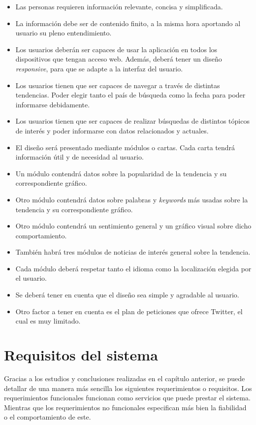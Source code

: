 \begin{itemize}
    \item
    Las personas requieren información relevante, concisa y simplificada.
    \item
    La información debe ser de contenido finito, a la misma hora aportando al usuario su pleno entendimiento.
    \item
    Los usuarios deberán ser capaces de usar la aplicación en todos los dispositivos que tengan acceso web. Además, deberá tener un diseño \textit{responsive}, para que se adapte a la interfaz del usuario.
    \item
    Los usuarios tienen que ser capaces de navegar a través de distintas tendencias. Poder elegir tanto el país de búsqueda como la fecha para poder informarse debidamente.
    \item
    Los usuarios tienen que ser capaces de realizar búsquedas de distintos tópicos de interés y poder informarse con datos relacionados y actuales.
    \item
    El diseño será presentado mediante módulos o cartas. Cada carta tendrá información útil y de necesidad al usuario.
    \item
    Un módulo contendrá datos sobre la popularidad de la tendencia y su correspondiente gráfico.
    \item
    Otro módulo contendrá datos sobre palabras y \textit{keywords} más usadas sobre la tendencia y su correspondiente gráfico.
    \item
    Otro módulo contendrá un sentimiento general y un gráfico visual sobre dicho comportamiento.
    \item
    También habrá tres módulos de noticias de interés general sobre la tendencia.
    \item
    Cada módulo deberá respetar tanto el idioma como la localización elegida por el usuario.
    \item
    Se deberá tener en cuenta que el diseño sea simple y agradable al usuario.
    \item
    Otro factor a tener en cuenta es el plan de peticiones que ofrece Twitter, el cual es muy limitado.
\end{itemize}

\newpage

\section{Requisitos del sistema}
Gracias a los estudios y conclusiones realizadas en el capítulo anterior, se puede detallar de una manera más sencilla los siguientes requerimientos o requisitos. Los requerimientos funcionales funcionan como servicios que puede prestar el sistema. Mientras que los requerimientos no funcionales especifican más bien la fiabilidad o el comportamiento de este.

